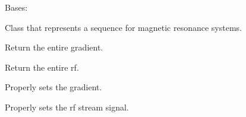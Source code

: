 \documentclass[a4paper,10pt,english]{sphinxmanual}
\begin{document}
\begin{fulllineitems}
\label{\detokenize{autodoc/mrsprint/mrsprint.sequence:mrsprint.sequence.sequence.Sequence}}
Bases: 

Class that represents a sequence for magnetic resonance systems.

\begin{fulllineitems}
\label{\detokenize{autodoc/mrsprint/mrsprint.sequence:mrsprint.sequence.sequence.Sequence.getGradient}}
Return the entire gradient.

\end{fulllineitems}


\begin{fulllineitems}
\label{\detokenize{autodoc/mrsprint/mrsprint.sequence:mrsprint.sequence.sequence.Sequence.getRF}}
Return the entire rf.

\end{fulllineitems}


\begin{fulllineitems}
\label{\detokenize{autodoc/mrsprint/mrsprint.sequence:mrsprint.sequence.sequence.Sequence.setGradient}}
Properly sets the gradient.

\end{fulllineitems}


\begin{fulllineitems}
\label{\detokenize{autodoc/mrsprint/mrsprint.sequence:mrsprint.sequence.sequence.Sequence.setRF}}
Properly sets the rf stream signal.

\end{fulllineitems}


\end{fulllineitems}
\end{document}
